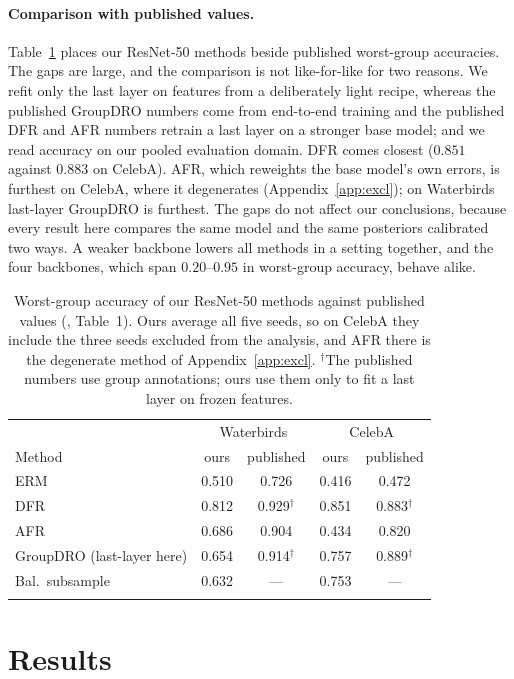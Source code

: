 \documentclass[pdflatex,sn-basic]{sn-jnl}%
\theoremstyle{thmstyleone}%
\begin{document}
\paragraph{Comparison with published values.} Table~\ref{tab:lit} places our
ResNet-50 methods beside published worst-group accuracies. The gaps are large, and the comparison
is not like-for-like for two reasons. We refit only the last layer on features from a deliberately
light recipe, whereas the published GroupDRO numbers come from end-to-end training and the published
DFR and AFR numbers retrain a last layer on a stronger base model; and we read accuracy on our pooled
evaluation domain. DFR comes closest ($0.851$ against $0.883$ on CelebA). AFR, which reweights the
base model's own errors, is furthest on CelebA, where it degenerates (Appendix~\ref{app:excl}); on
Waterbirds last-layer GroupDRO is furthest. The gaps
do not affect our conclusions, because every result here compares the same model and the same
posteriors calibrated two ways. A weaker backbone lowers all methods in a setting together, and the
four backbones, which span $0.20$--$0.95$ in worst-group accuracy, behave alike.

\begin{table}[t]
\centering
\caption{Worst-group accuracy of our ResNet-50 methods against published values (\citet{qiu2023}, Table~1). Ours average all five seeds, so on CelebA they include the three seeds excluded from the analysis, and AFR there is the degenerate method of Appendix~\ref{app:excl}. $^{\dagger}$The published numbers use group annotations; ours use them only to fit a last layer on frozen features.}
\label{tab:lit}
\small
\begin{tabular}{lcccc}
\toprule
 & \multicolumn{2}{c}{Waterbirds} & \multicolumn{2}{c}{CelebA} \\
Method & ours & published & ours & published \\
\midrule
ERM & 0.510 & 0.726 & 0.416 & 0.472 \\
DFR & 0.812 & 0.929$^{\dagger}$ & 0.851 & 0.883$^{\dagger}$ \\
AFR & 0.686 & 0.904 & 0.434 & 0.820 \\
GroupDRO (last-layer here) & 0.654 & 0.914$^{\dagger}$ & 0.757 & 0.889$^{\dagger}$ \\
Bal.\ subsample & 0.632 & --- & 0.753 & --- \\
\botrule
\end{tabular}
\end{table}

\section{Results}
\label{sec:results}
\end{document}
